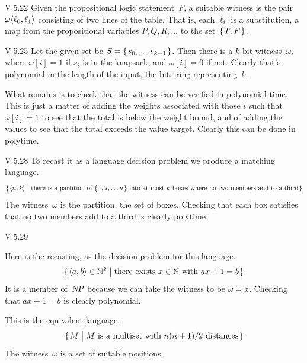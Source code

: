 %
\begin{ans}{V.5.22}
Given the propositional logic statement~$F$, a suitable witness is the
pair $\omega\langle\ell_0,\ell_1\rangle$ consisting of two lines of the
table.
That is, each $\ell_i$ is a substitution, a map from the
propositional variables $P,Q,R,\ldots$ to the set~$\set{T,F}$.
\end{ans}
%
%
%
\begin{ans}{V.5.25}
Let the given set be $S=\set{s_0,\ldots s_{k-1}}$.
Then there is a $k$-bit witness~$\omega$, where $\omega[i]=1$ if $s_i$ is in
the knapsack, and $\omega[i]=0$ if not.
Clearly that's polynomial in the length of the input, the bitstring
representing~$k$.

What remains is to check that the witness can be verified in polynomial
time.
This is just a matter of adding the weights associated with those $i$ such
that $\omega[i]=1$ to see that the total is below the weight bound,
and of adding the values to see that the total exceeds the value target.
Clearly this can be done in polytime.
\end{ans}
%
%
%
\begin{ans}{V.5.28}
To recast it as a language decision problem we produce a matching language.
\begin{equation*}
  \set{\sequence{n,k}\suchthat
        \text{there is a partition of $\set{1,2,\ldots{} n}$ into at most~$k$ boxes where no two members add to a third}}
\end{equation*}
The witness~$\omega$ is the partition, the set of boxes.
Checking that each box satisfies that no two members add to a third is clearly
polytime.
\end{ans}
%
\begin{ans}{V.5.29}
\begin{exparts}
\item
Here is the recasting, as the decision problem for this language.
\begin{equation*}
  \set{\sequence{a,b}\in\N^2\suchthat
        \text{there exists $x\in\N$ with $ax+1=b$}}
\end{equation*}
It is a member of~$\textsl{NP}$ because we can take the witness to be $\omega=x$.
Checking that $ax+1=b$ is clearly polynomial.
\item
This is the equivalent language.
\begin{equation*}
  \set{M\suchthat
        \text{$M$ is a multiset with $n(n+1)/2$ distances}}
\end{equation*}
The witness~$\omega$ is a set of suitable positions.
\end{exparts}
\end{ans}
